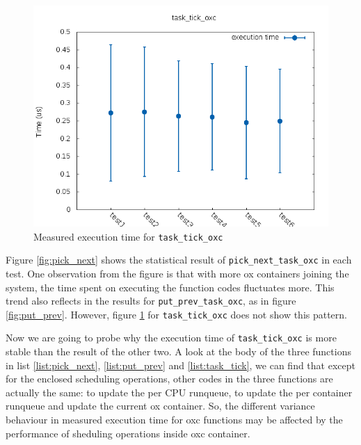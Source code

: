 \begin{figure}[H]%
        \centering
        \includegraphics[width=\textwidth, totalheight=0.4\textheight]{images/task_tick_oxc}
        \caption{Measured execution time for \texttt{task\_tick\_oxc}}
        \label{fig:task_tick}
\end{figure}
Figure \ref{fig:pick_next} shows the statistical result of 
\texttt{pick\_next\_task\_oxc} in each test. One observation from the figure
is that with more ox containers joining the system, the time spent on executing
the function codes fluctuates more. This trend also reflects in the
results for \texttt{put\_prev\_task\_oxc}, as in figure \ref{fig:put_prev}.
However, figure \ref{fig:task_tick} for \texttt{task\_tick\_oxc} does not 
show this pattern.

Now we are going to probe why the execution time of \texttt{task\_tick\_oxc}
is more stable than the result of the other two. A look at the body of the
three functions in list \ref{list:pick_next}, \ref{list:put_prev} and
\ref{list:task_tick}, we can find that except for the enclosed scheduling
operations, other codes in the three functions are actually the same:
to update the per CPU runqueue, to update the per container runqueue and
update the current ox container. So, the different variance behaviour in 
measured execution time for oxc functions may be affected by the performance
of sheduling operations inside oxc container. 

